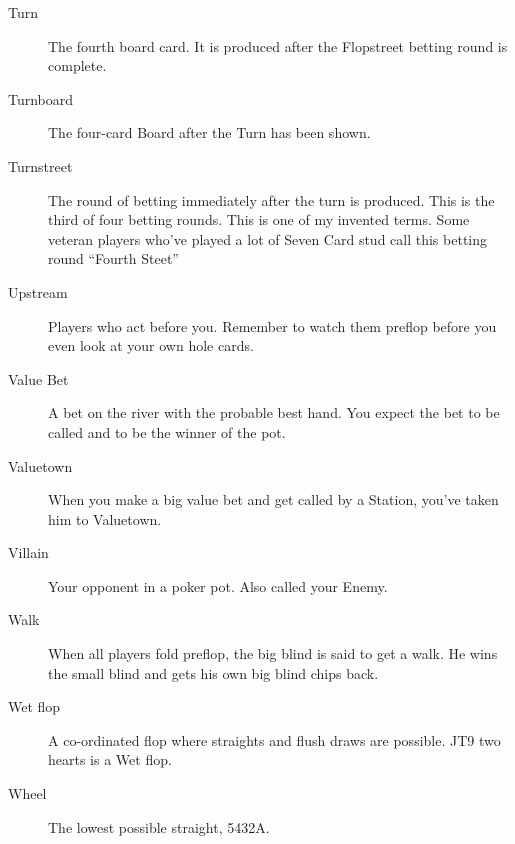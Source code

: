 \begin{description}
\item[Turn] The fourth board card. It is produced after the Flopstreet
betting round is complete.

\item[Turnboard] The four-card Board after the Turn has been shown.

\item[Turnstreet] The round of betting immediately after the turn is
produced. This is the third of four betting rounds. This is one
of my invented terms. Some veteran players who've played a lot of
Seven Card stud call this betting round ``Fourth Steet''

\item[Upstream] Players who act before you. Remember to watch them
preflop before you even look at your own hole cards.

\item[Value Bet] A bet on the river with the probable best hand. You
expect the bet to be called and to be the winner of the pot.

\item[Valuetown] When you make a big value bet and get called by
a Station, you've taken him to Valuetown.

\item[Villain] Your opponent in a poker pot. Also called your Enemy.

\item[Walk] When all players fold preflop, the big blind is said to
get a walk. He wins the small blind and gets his own big blind chips
back.

\item[Wet flop] A co-ordinated flop where straights and flush draws
are possible. JT9 two hearts is a Wet flop.

\item[Wheel] The lowest possible straight, 5432A.

\end{description}
